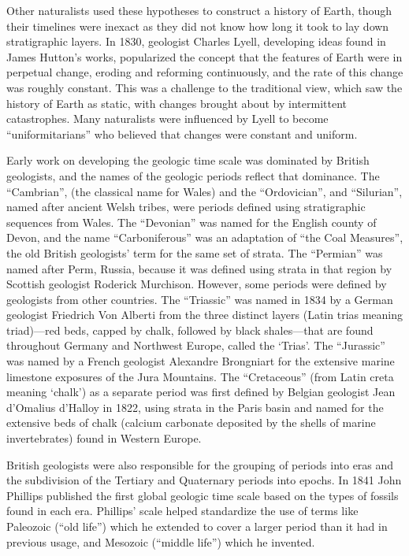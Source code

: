 \documentclass[]{book}
\theoremstyle{definition}
\theoremstyle{definition}
\theoremstyle{definition}
\theoremstyle{remark}
\begin{document}
Other naturalists used these hypotheses to construct a history of Earth,
though their timelines were inexact as they did not know how long it
took to lay down stratigraphic layers. In 1830, geologist Charles Lyell,
developing ideas found in James Hutton's works, popularized the concept
that the features of Earth were in perpetual change, eroding and
reforming continuously, and the rate of this change was roughly
constant. This was a challenge to the traditional view, which saw the
history of Earth as static, with changes brought about by intermittent
catastrophes. Many naturalists were influenced by Lyell to become
``uniformitarians'' who believed that changes were constant and uniform.

Early work on developing the geologic time scale was dominated by
British geologists, and the names of the geologic periods reflect that
dominance. The ``Cambrian'', (the classical name for Wales) and the
``Ordovician'', and ``Silurian'', named after ancient Welsh tribes, were
periods defined using stratigraphic sequences from Wales. The
``Devonian'' was named for the English county of Devon, and the name
``Carboniferous'' was an adaptation of ``the Coal Measures'', the old
British geologists' term for the same set of strata. The ``Permian'' was
named after Perm, Russia, because it was defined using strata in that
region by Scottish geologist Roderick Murchison. However, some periods
were defined by geologists from other countries. The ``Triassic'' was
named in 1834 by a German geologist Friedrich Von Alberti from the three
distinct layers (Latin trias meaning triad)---red beds, capped by chalk,
followed by black shales---that are found throughout Germany and
Northwest Europe, called the `Trias'. The ``Jurassic'' was named by a
French geologist Alexandre Brongniart for the extensive marine limestone
exposures of the Jura Mountains. The ``Cretaceous'' (from Latin creta
meaning `chalk') as a separate period was first defined by Belgian
geologist Jean d'Omalius d'Halloy in 1822, using strata in the Paris
basin and named for the extensive beds of chalk (calcium carbonate
deposited by the shells of marine invertebrates) found in Western
Europe.

British geologists were also responsible for the grouping of periods
into eras and the subdivision of the Tertiary and Quaternary periods
into epochs. In 1841 John Phillips published the first global geologic
time scale based on the types of fossils found in each era. Phillips'
scale helped standardize the use of terms like Paleozoic (``old life'')
which he extended to cover a larger period than it had in previous
usage, and Mesozoic (``middle life'') which he invented.
\end{document}
